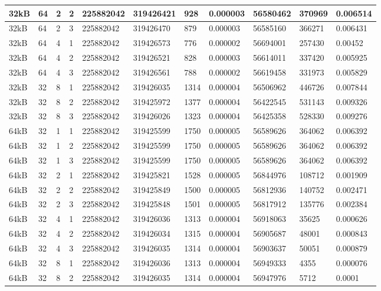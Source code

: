 \documentclass[conference]{IEEEtran}
\begin{document}
\begin{table}
\begin{tabular}{|m{.75cm} |m{.75cm} |m{.8cm} | m{.75cm} | l | l | l | l | l | l | l |}
32kB&	64&	2&	2&	225882042&	319426421&	928	  &0.000003	  &56580462	  &370969	  &0.006514 \\ \hline
32kB&	64&	2&	3&	225882042&	319426470&	879	  &0.000003	  &56585160	  &366271	  &0.006431 \\ \hline
32kB&	64&	4&	1&	225882042&	319426573&	776	  &0.000002	  &56694001	  &257430	  &0.00452 \\ \hline
32kB&	64&	4&	2&	225882042&	319426521&	828	  &0.000003	  &56614011	  &337420	  &0.005925 \\ \hline
32kB&	64&	4&	3&	225882042&	319426561&	788	  &0.000002	  &56619458	  &331973	  &0.005829 \\ \hline
32kB&	32&	8&	1&	225882042&	319426035&	1314  &	0.000004  &	56506962  &	446726	&0.007844 \\ \hline
32kB&	32&	8&	2&	225882042&	319425972&	1377  &	0.000004  &	56422545  &	531143	&0.009326 \\ \hline
32kB&	32&	8&	3&	225882042&	319426026&	1323  &	0.000004  &	56425358  &	528330	&0.009276 \\ \hline
64kB&	32&	1&	1&	225882042&	319425599&	1750  &	0.000005  &	56589626  &	364062	&0.006392 \\ \hline
64kB&	32&	1&	2&	225882042&	319425599&	1750  &	0.000005  &	56589626  &	364062	&0.006392 \\ \hline
64kB&	32&	1&	3&	225882042&	319425599&	1750  &	0.000005  &	56589626  &	364062	&0.006392 \\ \hline
64kB&	32&	2&	1&	225882042&	319425821&	1528  &	0.000005  &	56844976  &	108712	&0.001909 \\ \hline
64kB&	32&	2&	2&	225882042&	319425849&	1500  &	0.000005  &	56812936  &	140752	&0.002471 \\ \hline
64kB&	32&	2&	3&	225882042&	319425848&	1501  &	0.000005  &	56817912  &	135776	&0.002384 \\ \hline
64kB&	32&	4&	1&	225882042&	319426036&	1313  &	0.000004  &	56918063  &	35625	  &0.000626 \\ \hline
64kB&	32&	4&	2&	225882042&	319426034&	1315  &	0.000004  &	56905687  &	48001	  &0.000843 \\ \hline
64kB&	32&	4&	3&	225882042&	319426035&	1314  &	0.000004  &	56903637  &	50051	  &0.000879 \\ \hline
64kB&	32&	8&	1&	225882042&	319426036&	1313  &	0.000004  &	56949333  &	4355	  &0.000076 \\ \hline
64kB&	32&	8&	2&	225882042&	319426035&	1314  &	0.000004  &	56947976  &	5712	  &0.0001 \\ \hline

\end{tabular}
\end{table}
\end{document}
